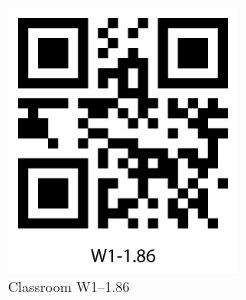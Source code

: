\documentclass[11pt]{scrartcl}
\begin{document}
	\begin{figure}[htpb]
		\centering
		\includegraphics[height=7cm]{figure/qrcode_W1-186}
		\caption{Classroom W1--1.86\label{qrCodeW1-1.86}}
	\end{figure}
\end{document}
